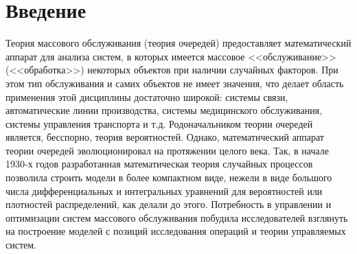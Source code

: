 \chapter*{Введение}							%

\newcommand{\actuality}{{\textbf\actualityTXT}}
\newcommand{\progress}{}
\newcommand{\aim}{{\textbf\aimTXT}}
\newcommand{\tasks}{\textbf{\tasksTXT}}
\newcommand{\novelty}{\textbf{\noveltyTXT}}
\newcommand{\influence}{\textbf{\influenceTXT}}
\newcommand{\methods}{\textbf{\methodsTXT}}
\newcommand{\defpositions}{\textbf{\defpositionsTXT}}
\newcommand{\reliability}{\textbf{\reliabilityTXT}}
\newcommand{\probation}{\textbf{\probationTXT}}
\newcommand{\contribution}{\textbf{\contributionTXT}}
\newcommand{\publications}{\textbf{\publicationsTXT}}

{\actuality} 
Теория массового обслуживания (теория очередей) предоставляет математический аппарат для анализа систем, в которых имеется массовое <<обслуживание>> (<<обработка>>) некоторых объектов при наличии случайных факторов. При этом тип обслуживания и самих объектов не имеет значения, что делает область применения этой дисциплины достаточно широкой: системы связи, автоматические линии производства, системы медицинского обслуживания, системы управления транспорта и т.д.   
Родоначальником теории очередей является, бесспорно, теория вероятностей. Однако, математический аппарат теории очередей эволюционировал на протяжении целого века. Так, в начале 1930-х годов разработанная математическая теория случайных процессов позволила строить модели в более компактном виде, нежели в виде большого числа дифференциальных и интегральных уравнений для вероятностей или плотностей распределений, как делали до этого. Потребность в управлении и оптимизации систем массового обслуживания побудила исследователей взглянуть на построение моделей с позиций исследования операций и теории управляемых систем.


